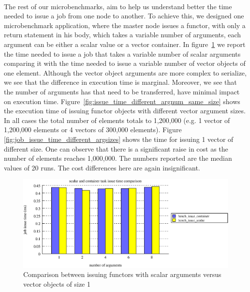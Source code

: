 \paragraph{}
	The rest of our microbenchmarks, aim to help us understand better the time needed to issue a job from one
node to another.  To achieve this, we designed one microbenchmark application, where the master node issues
a functor, with only a return statement in his body, which takes a variable number of arguments, each argument
can be either a scalar value or a vector container.  In figure~\ref{fig:issue_time_scalar_vs_containers} we report
the time needed to issue a job that takes a variable number of scalar arguments comparing it with the time needed
to issue a variable number of vector objects of one element.  Although the vector object arguments are more complex
to serialize, we see that the difference in execution time is marginal.  Moreover, we see that the number of arguments
has that need to be transferred, have minimal impact on execution time.  
Figure~\ref{fig:issue_time_different_argnum_same_size} shows the execution time of issuing functor objects with different
vector argument sizes.  In all cases the total number of elements totals to 1,200,000 (e.g. 1 vector of 1,200,000 elements or
4 vectors of 300,000 elements).   Figure \ref{fig:job_issue_time_different_argsizes} shows the time for issuing 1 vector 
of different size.  One can observe that there is a significant raise in cost as the number of elements reaches 1,000,000.
The numbers reported are the median values of 20 runs.  The cost differences here are 
again insignificant. 

\begin{figure}[!ht]
\includegraphics[width=\columnwidth]{figures/job_issue_time_scalar_vs_container_bars}
\caption{Comparison between issuing functors with scalar arguments versus vector objects of size 1}
\label{fig:issue_time_scalar_vs_containers}
\end{figure}

